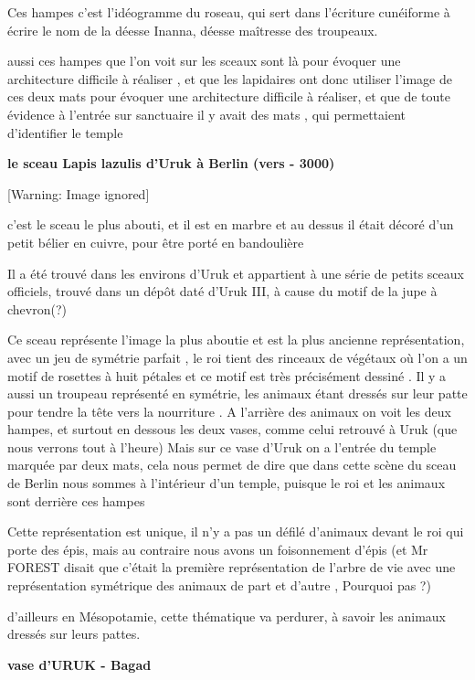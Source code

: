 \documentclass[a4paper,10pt]{article}
\begin{document}
Ces hampes c'est l'idéogramme du
roseau, qui sert dans l'écriture cunéiforme à écrire
le nom de la déesse Inanna, déesse maîtresse des troupeaux.

aussi ces hampes que l'on voit sur les sceaux sont là
pour évoquer une architecture difficile à réaliser , et que les
lapidaires ont donc utiliser l'image de ces deux mats
pour évoquer une architecture difficile à réaliser, et que de toute
évidence à l'entrée sur sanctuaire il y avait des mats
, qui permettaient d'identifier le temple

\textbf{le sceau Lapis lazulis d'Uruk à Berlin (vers -
3000)}

  [Warning: Image ignored] %
 

c'est le sceau le plus abouti, et il est en marbre et
au dessus il était décoré d'un petit bélier en cuivre,
pour être porté en bandoulière

Il a été trouvé dans les environs d'Uruk et appartient
à une série de petits sceaux officiels, trouvé dans un dépôt daté
d'Uruk III, à cause du motif de la jupe à chevron(?)

Ce sceau représente l'image la plus aboutie et est la
plus ancienne représentation, avec un jeu de symétrie parfait , le roi
tient des rinceaux de végétaux où l'on a un motif de
rosettes à huit pétales et ce motif est très précisément dessiné . Il y
a aussi un troupeau représenté en symétrie, les animaux étant dressés
sur leur patte pour tendre la tête vers la nourriture . A
l'arrière des animaux on voit les deux hampes, et
surtout en dessous les deux vases, comme celui retrouvé à Uruk (que
nous verrons tout à l'heure) Mais sur ce vase
d'Uruk on a l'entrée du temple
marquée par deux mats, cela nous permet de dire que dans cette scène du
sceau de Berlin nous sommes à l'intérieur
d'un temple, puisque le roi et les animaux sont
derrière ces hampes

Cette représentation est unique, il n'y a pas un défilé
d'animaux devant le roi qui porte des épis,  mais au
contraire nous avons un foisonnement d'épis (et Mr
FOREST disait que c'était la première représentation
de l'arbre de vie avec une représentation symétrique
des animaux de part et d'autre , Pourquoi pas ?)

d'ailleurs en Mésopotamie, cette thématique va
perdurer,  à savoir les animaux dressés sur leurs pattes.

\textbf{vase d'URUK - Bagad\ \ }
\end{document}
